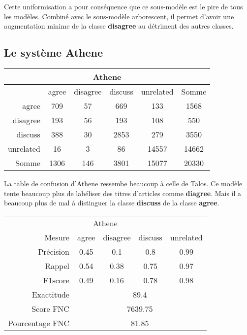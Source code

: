\documentclass[onecolumn, 12pt]{article}
\begin{document}
Cette uniformisation a pour conséquence que ce sous-modèle est le pire de tous les modèles. Combiné avec le sous-modèle arborescent, il permet d'avoir une augmentation minime de la classe \textbf{disagree} au détriment des autres classes.

\subsection{Le système Athene}


\begin{center}
 \begin{tabular}{ r | c c c c | c }
  \multicolumn{6}{c}{Athene}                                 \\
  \hline
            & agree & disagree & discuss & unrelated & Somme \\
  \hline
  agree     & 709   & 57       & 669     & 133       & 1568  \\
  disagree  & 193   & 56       & 193     & 108       & 550   \\
  discuss   & 388   & 30       & 2853    & 279       & 3550  \\
  unrelated & 16    & 3        & 86      & 14557     & 14662 \\
  \hline
  Somme     & 1306  & 146      & 3801    & 15077     & 20330 \\
 \end{tabular}
\end{center}



La table de confusion d'Athene ressembe beaucoup à celle de Talos. Ce modèle tente beaucoup plus de labéliser des titres d'articles comme \textbf{diagree}. Mais il a beaucoup plus de mal à distinguer la classe \textbf{discuss} de la classe \textbf{agree}.

\begin{center}
 \begin{tabular}{ r | c c c c }
  \multicolumn{5}{c}{Athene}                                                     \\
  Mesure          & agree                       & disagree & discuss & unrelated \\
  \hline
  Précision       & 0.45                        & 0.1      & 0.8     & 0.99      \\
  Rappel          & 0.54                        & 0.38     & 0.75    & 0.97      \\
  F1score         & 0.49                        & 0.16     & 0.78    & 0.98      \\
  \hline
  \hline
  Exactitude      & \multicolumn{4}{c}{89.4}                                     \\
  Score FNC       & \multicolumn{4}{c}{7639.75}                                  \\
  Pourcentage FNC & \multicolumn{4}{c}{81.85}                                    \\
 \end{tabular}
\end{center}
\end{document}
